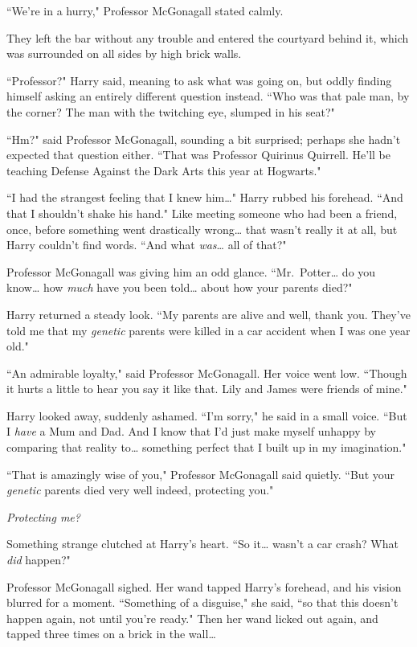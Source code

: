 ``We're in a hurry," Professor McGonagall stated calmly.

They left the bar without any trouble and entered the courtyard behind it, which was surrounded on all sides by high brick walls.

``Professor?" Harry said, meaning to ask what was going on, but oddly finding himself asking an entirely different question instead. ``Who was that pale man, by the corner? The man with the twitching eye, slumped in his seat?"

``Hm?" said Professor McGonagall, sounding a bit surprised; perhaps she hadn't expected that question either. ``That was Professor Quirinus Quirrell. He'll be teaching Defense Against the Dark Arts this year at Hogwarts."

``I had the strangest feeling that I knew him{\ldots}" Harry rubbed his forehead. ``And that I shouldn't shake his hand." Like meeting someone who had been a friend, once, before something went drastically wrong{\ldots} that wasn't really it at all, but Harry couldn't find words. ``And what \emph{was}{\ldots} all of that?"

Professor McGonagall was giving him an odd glance. ``Mr.~Potter{\ldots} do you know{\ldots} how \emph{much} have you been told{\ldots} about how your parents died?"

Harry returned a steady look. ``My parents are alive and well, thank you. They've told me that my \emph{genetic} parents were killed in a car accident when I was one year old."

``An admirable loyalty," said Professor McGonagall. Her voice went low. ``Though it hurts a little to hear you say it like that. Lily and James were friends of mine."

Harry looked away, suddenly ashamed. ``I'm sorry," he said in a small voice. ``But I \emph{have} a Mum and Dad. And I know that I'd just make myself unhappy by comparing that reality to{\ldots} something perfect that I built up in my imagination."

``That is amazingly wise of you," Professor McGonagall said quietly. ``But your \emph{genetic} parents died very well indeed, protecting you."

\emph{Protecting me?}

Something strange clutched at Harry's heart. ``So it{\ldots} wasn't a car crash? What \emph{did} happen?"

Professor McGonagall sighed. Her wand tapped Harry's forehead, and his vision blurred for a moment. ``Something of a disguise," she said, ``so that this doesn't happen again, not until you're ready." Then her wand licked out again, and tapped three times on a brick in the wall{\ldots}

